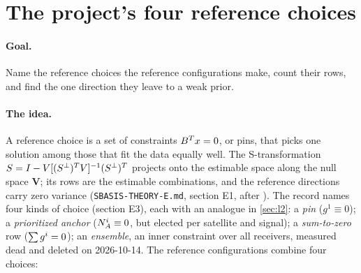 
\section{The project's four reference choices}\label{sec:l4}

\paragraph{Goal.} Name the reference choices the reference configurations make,
count their rows, and find the one direction they leave to a weak prior.

\paragraph{The idea.} A reference choice is a set of constraints
$B^{T}x = 0$, or pins, that picks one solution among those that fit
the data equally well. The S-transformation
$S = I - V[(S^\perp)^{T}V]^{-1}(S^\perp)^{T}$ projects
onto the estimable space along the null space $\bm{V}$; its rows are the
estimable combinations, and the reference directions carry zero variance
(\texttt{SBASIS-THEORY-E.md}, section E1, after \cite{teunissen1985generalised,
odijk2016estimability}). The record names four kinds of choice (section E3), each
with an analogue in \cref{sec:l2}: a \emph{pin} ($g^1 \equiv 0$); a
\emph{prioritized anchor} ($N^i_A \equiv 0$, but elected per satellite and
signal); a \emph{sum-to-zero} row ($\sum g^i = 0$); an \emph{ensemble}, an inner
constraint over all receivers, measured dead and deleted on 2026-10-14. The
reference configurations combine four choices:

